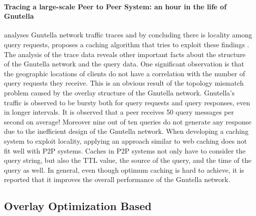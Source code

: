 \paragraph*{\bf Tracing a large-scale Peer to Peer System: an hour in the life
of Gnutella}
\cite{Markatos02} analyses Gnutella network traffic traces and by concluding
there is locality among query requests, proposes a caching algorithm that tries
to exploit these findings . The analysis of the trace data reveals other
important facts about the structure of the Gnutella network and the query data.
One significant observation is that the geographic locations of clients do not
have a correlation with the number of query requests they receive. This is an
obvious result of the topology mismatch problem caused by the overlay structure
of the Gnutella network. Gnutella's traffic is observed to be bursty both for
query requests and query responses, even in longer intervals. It is observed
that a peer receives 50 query messages per second on average! Moreover nine out
of ten queries do not generate any response due to the inefficient design of
the Gnutella network. When developing a caching system to exploit locality,
applying an approach similar to web caching does not fit well with P2P systems.
Caches in P2P systems not only have to consider the query string, but also
the TTL value, the source of the query, and the time of the query as well.  In
general, even though optimum caching is hard to achieve, it is reported that
it improves the overall performance of the Gnutella network.

\subsection{Overlay Optimization Based}

